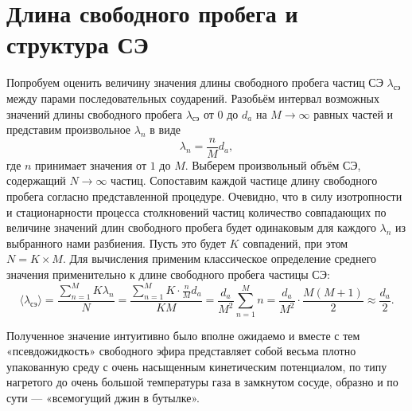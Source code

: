 \section{Длина свободного пробега и структура СЭ}

Попробуем оценить величину значения длины свободного пробега частиц СЭ \(\lambda_{\text{сэ}}\) между парами последовательных соударений. Разобьём интервал возможных значений длины свободного пробега \(\lambda_{\text{сэ}}\) от \(0\) до \(d_a\) на \(M \to \infty\) равных частей и представим произвольное \(\lambda_n\) в виде
\[
\lambda_n = \frac{n}{M} d_a,
\]
где \(n\) принимает значения от \(1\) до \(M\). Выберем произвольный объём СЭ, содержащий \(N \to \infty\) частиц. Сопоставим каждой частице длину свободного пробега согласно представленной процедуре. Очевидно, что в силу изотропности и стационарности процесса столкновений частиц количество совпадающих по величине значений длин свободного пробега будет одинаковым для каждого \(\lambda_n\) из выбранного нами разбиения. Пусть это будет \(K\) совпадений, при этом \(N = K \times M\). Для вычисления применим классическое определение среднего значения применительно к длине свободного пробега частицы СЭ:
\[
\langle\lambda_{\text{сэ}}\rangle = \frac{\sum_{n=1}^{M} K \lambda_n}{N} = \frac{\sum_{n=1}^{M} K \cdot \frac{n}{M}d_a}{KM} = \frac{d_a}{M^2} \sum_{n=1}^{M} n = \frac{d_a}{M^2} \cdot \frac{M(M+1)}{2} \approx \frac{d_a}{2}.
\]

Полученное значение интуитивно было вполне ожидаемо и вместе с тем «псевдожидкость» свободного эфира представляет собой весьма плотно упакованную среду с очень насыщенным кинетическим потенциалом, по типу нагретого до очень большой температуры газа в замкнутом сосуде, образно и по сути — «всемогущий джин в бутылке».



